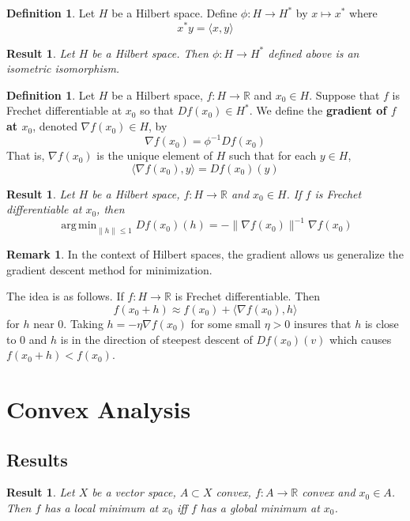 \documentclass[twoside]{article}
\newtheorem{res}[thm]{Result}
\theoremstyle{definition}
\newtheorem{defn}[definition]{Definition}
\theoremstyle{definition}
\newtheorem{rem}[definition]{Remark}
\newcommand{\R}{\mathbb{R}}
\renewcommand{\r}{\rangle}
\renewcommand{\l}{\langle}
\DeclareMathOperator*{\argmin}{arg\,min}
\begin{document}
\begin{defn}
Let $H$ be a Hilbert space. Define $\phi:H \rightarrow H^*$ by $x \mapsto x^*$ where $$x^*y = \l x ,y\r$$
\end{defn}

\begin{res}
Let $H$ be a Hilbert space. Then $\phi: H \rightarrow H^*$ defined above is an isometric isomorphism.
\end{res}

\begin{defn}
Let $H$ be a Hilbert space, $f: H \rightarrow \R$ and $x_0 \in H$. Suppose that $f$ is Frechet differentiable at $x_0$ so that $Df(x_0) \in H^*$. We define the \textbf{gradient of $f$ at $x_0$}, denoted $\nabla f(x_0) \in H$, by $$\nabla f(x_0) = \phi^{-1}Df(x_0)$$ That is, $\nabla f(x_0)$ is the unique element of $H$ such that for each $y \in H$, $$\l \nabla f(x_0), y \r = Df(x_0)(y)$$
\end{defn}

\begin{res}
Let $H$ be a Hilbert space, $f:H \rightarrow \R$ and $x_0 \in H$. If $f$ is Frechet differentiable at $x_0$, then 
$$\argmin_{\|h\| \leq 1} Df(x_0)(h) = - \|\nabla f(x_0)\|^{-1} \nabla f(x_0)$$ 
\end{res} 

\begin{rem}
In the context of Hilbert spaces, the gradient allows us generalize the gradient descent method for minimization.

The idea is as follows. If $f:H \rightarrow \R$ is Frechet differentiable. Then $$f(x_0+h) \approx f(x_0) + \l \nabla f(x_0), h \r$$ for $h$ near $0$. Taking $h = - \eta \nabla f(x_0)$ for some small $\eta >0$ insures that $h$ is close to $0$ and $h$ is in the direction of steepest descent of  $Df(x_0)(v)$ which causes $f(x_0+h) < f(x_0)$. 
\end{rem}

\section{Convex Analysis}

\subsection{Results}
\begin{res}
Let $X$ be a vector space, $A \subset X$ convex, $f:A \rightarrow \R$ convex and $x_0 \in A$. Then $f$ has a local minimum at $x_0$ iff $f$ has a global minimum at $x_0$.
\end{res}
\end{document}
